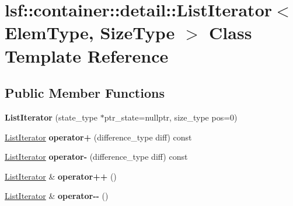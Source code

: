 \hypertarget{classlsf_1_1container_1_1detail_1_1ListIterator}{
\section{lsf::container::detail::ListIterator$<$ ElemType, SizeType $>$ Class Template Reference}
\label{classlsf_1_1container_1_1detail_1_1ListIterator}
}
\subsection*{Public Member Functions}
\begin{DoxyCompactItemize}
\item 
\hypertarget{classlsf_1_1container_1_1detail_1_1ListIterator_a737b012d4138d227dcbfb31c9a721ba2}{
{\bfseries ListIterator} (state\_\-type $\ast$ptr\_\-state=nullptr, size\_\-type pos=0)}
\label{classlsf_1_1container_1_1detail_1_1ListIterator_a737b012d4138d227dcbfb31c9a721ba2}

\item 
\hypertarget{classlsf_1_1container_1_1detail_1_1ListIterator_a23c39ffbc9244d26b856a64e299db1af}{
\hyperlink{classlsf_1_1container_1_1detail_1_1ListIterator}{ListIterator} {\bfseries operator+} (difference\_\-type diff) const }
\label{classlsf_1_1container_1_1detail_1_1ListIterator_a23c39ffbc9244d26b856a64e299db1af}

\item 
\hypertarget{classlsf_1_1container_1_1detail_1_1ListIterator_a76f943d712b5751198b316ec5798a4d7}{
\hyperlink{classlsf_1_1container_1_1detail_1_1ListIterator}{ListIterator} {\bfseries operator-\/} (difference\_\-type diff) const }
\label{classlsf_1_1container_1_1detail_1_1ListIterator_a76f943d712b5751198b316ec5798a4d7}

\item 
\hypertarget{classlsf_1_1container_1_1detail_1_1ListIterator_a0fc177f8b085bafb4a34d389834b4d3e}{
\hyperlink{classlsf_1_1container_1_1detail_1_1ListIterator}{ListIterator} \& {\bfseries operator++} ()}
\label{classlsf_1_1container_1_1detail_1_1ListIterator_a0fc177f8b085bafb4a34d389834b4d3e}

\item 
\hypertarget{classlsf_1_1container_1_1detail_1_1ListIterator_a5dec50962648d260a5bc4f47ef78e1bd}{
\hyperlink{classlsf_1_1container_1_1detail_1_1ListIterator}{ListIterator} \& {\bfseries operator-\/-\/} ()}
\label{classlsf_1_1container_1_1detail_1_1ListIterator_a5dec50962648d260a5bc4f47ef78e1bd}


\end{DoxyCompactItemize}
